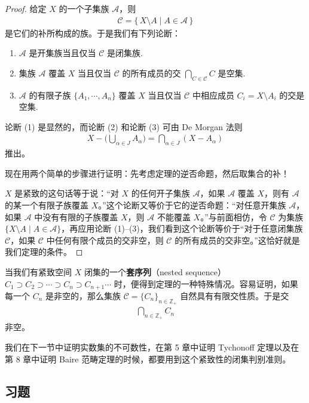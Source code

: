 \begin{proof}
给定 $X$ 的一个子集族 $\mathcal{A}$，则
\begin{align*}
\mathcal{C}=\{\,X\setminus A\mid A\in\mathcal{A}\,\}
\end{align*}
是它们的补所构成的族。于是我们有下列论断：
\begin{enumerate}
\item $\mathcal{A}$ 是开集族当且仅当 $\mathcal{C}$ 是闭集族.
\item 集族 $\mathcal{A}$ 覆盖 $X$ 当且仅当 $\mathcal{C}$ 的所有成员的交 $\bigcap_{C\in\mathcal{C}}C$ 是空集.
\item $\mathcal{A}$ 的有限子族 $\{A_{1},\cdots,A_{n}\}$ 覆盖 $X$ 当且仅当 $\mathcal{C}$ 中相应成员 $C_{i}=X\setminus A_{i}$ 的交是空集.
\end{enumerate}
论断 (1) 是显然的，而论断 (2) 和论断 (3) 可由 De Morgan 法则
\begin{align*}
X-\Big(\bigcup_{\alpha\in J}A_{\alpha}\Big)=\bigcap_{\alpha\in J}(X-A_{\alpha})
\end{align*}
推出。

现在用两个简单的步骤进行证明：先考虑定理的逆否命题，然后取集合的补！

$X$ 是紧致的这句话等于说：``对 $X$ 的任何开子集族 $\mathcal{A}$，如果 $\mathcal{A}$ 覆盖 $X$，则有 $\mathcal{A}$ 的某一个有限子族覆盖 $X$。''这个论断又等价于它的逆否命题：``对任意开集族 $\mathcal{A}$，如果 $\mathcal{A}$ 中没有有限的子族覆盖 $X$，则 $\mathcal{A}$ 不能覆盖 $X$。''与前面相仿，令 $\mathcal{C}$ 为集族 $\{X\setminus A\mid A\in\mathcal{A}\}$，再应用论断 (1)--(3)，我们看到这个论断等价于``对于任意闭集族 $\mathcal{C}$，如果 $\mathcal{C}$ 中任何有限个成员的交非空，则 $\mathcal{C}$ 的所有成员的交非空。''这恰好就是我们定理的条件。
\end{proof}

当我们有紧致空间 $X$ 闭集的一个\textbf{套序列}（nested sequence）$C_{1}\supset C_{2}\supset\cdots\supset C_{n}\supset C_{n+1}\cdots$ 时，便得到定理的一种特殊情况。容易证明，如果每一个 $C_{n}$ 是非空的，那么集族 $\mathcal{C}=\{C_{n}\}_{n\in\mathbb{Z}_{+}}$ 自然具有有限交性质。于是交
\begin{align*}
\bigcap_{n\in\mathbb{Z}_{+}}C_{n}
\end{align*}
非空。

我们在下一节中证明实数集的不可数性，在第 5 章中证明 Tychonoff 定理以及在第 8 章中证明 Baire 范畴定理的时候，都要用到这个紧致性的闭集判别准则。

\subsection*{习题}

